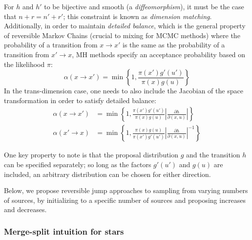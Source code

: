 \documentclass[11pt]{article}
\begin{document}
For $h$ and $h'$ to be bijective and smooth (a \emph{diffeomorphism}),
it must be the case that $n+r=n'+r'$; this constraint is known as
\emph{dimension matching}. Additionally, in order to maintain \emph{detailed
balance}, which is the general property of reversible Markov Chains
(crucial to mixing for MCMC methods) where the probability of a transition
from $x\to x'$ is the same as the probability of a transition from
$x'\to x$, MH methods specify an acceptance probability based on
the likelihood $\pi$: 
\[
\alpha\left(x\to x'\right)=\min\left\{ 1,\frac{\pi\left(x'\right)g'\left(u'\right)}{\pi\left(x\right)g\left(u\right)}\right\} 
\]
In the trans-dimension case, one needs to also include the Jacobian
of the space transformation in order to satisfy detailed balance:
\begin{align*}
\alpha\left(x\to x'\right) & =\min\left\{ 1,\frac{\pi\left(x'\right)g'\left(u'\right)}{\pi\left(x\right)g\left(u\right)}\left|\frac{\partial h}{\partial\left(x,u\right)}\right|\right\} \\
\alpha\left(x'\to x\right) & =\min\left\{ 1,\frac{\pi\left(x\right)g\left(u\right)}{\pi\left(x'\right)g'\left(u'\right)}\left|\frac{\partial h}{\partial\left(x,u\right)}\right|^{-1}\right\} 
\end{align*}




One key property to note is that the proposal distribution $g$ and
the transition $h$ can be specified separately; so long as the factors
$g'\left(u'\right)$ and $g\left(u\right)$ are included, an arbitrary
distribution can be chosen for either direction.

Below, we propose reversible jump approaches to sampling from varying
numbers of sources, by initializing to a specific number of sources
and proposing increases and decreases.


\subsubsection{Merge-split intuition for stars}
\end{document}
